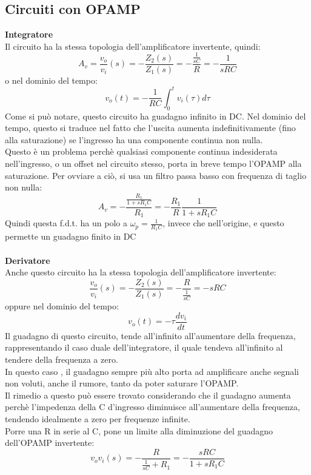 \documentclass{article}
\begin{document}
\subsection{Circuiti con OPAMP}
\textbf{Integratore}\\
Il circuito ha la stessa topologia dell'amplificatore invertente, quindi:
\begin{equation}
    A_{v}=\frac{v_{o}}{v_{i}}(s)=-\frac{Z_{2}(s)}{Z_{1}(s)}=-\frac{\frac{1}{sC}}{R}=-\frac{1}{sRC}
\end{equation}
o nel dominio del tempo:
\begin{equation}
    v_{o}(t)=-\frac{1}{RC}\int_{0}^{t}v_{i}(\tau)d\tau
\end{equation}
Come si può notare, questo circuito ha guadagno infinito in DC. Nel dominio del tempo, questo si traduce nel fatto che l'uscita aumenta indefinitivamente (fino alla saturazione) se l'ingresso ha una componente continua non nulla.\\
Questo è un problema perchè qualsiasi componente continua indesiderata nell'ingresso, o un offset nel circuito stesso, porta in breve tempo l'OPAMP alla saturazione.
Per ovviare a ciò, si usa un filtro passa basso con frequenza di taglio non nulla:
\begin{equation}
A_{v}=-\frac{\frac{R_{1}}{1+sR_{1}C}}{R_{1}}=-\frac{R_{1}}{R}\frac{1}{1+sR_{1}C}
\end{equation}
Quindi questa f.d.t. ha un polo a $\omega_{p}=\frac{1}{R_{1}C}$, invece che nell'origine, e questo permette un guadagno finito in DC \\\\
\textbf{Derivatore}\\
Anche questo circuito ha la stessa topologia dell'amplificatore invertente:
\begin{equation}
    \frac{v_{o}}{v_{i}}(s)=-\frac{Z_{2}(s)}{Z_{1}(s)}=-\frac{R}{\frac{1}{sC}}=-sRC
\end{equation}
oppure nel dominio del tempo:
\begin{equation}
    v_{o}(t)=-\tau\frac{dv_{i}}{dt}
\end{equation}
Il guadagno di questo circuito, tende all'infinito all'aumentare della frequenza, rappresentando il caso duale dell'integratore, il quale tendeva all'infinito al tendere della frequenza a zero.\\
In questo caso , il guadagno sempre più alto porta ad amplificare anche segnali non voluti, anche il rumore, tanto da poter saturare l'OPAMP.\\
Il rimedio a questo può essere trovato considerando che il guadagno aumenta perchè l'impedenza della C d'ingresso diminuisce all'aumentare della frequenza, tendendo idealmente a zero per frequenze infinite.\\
Porre una R in serie al C, pone un limite alla diminuzione del guadagno dell'OPAMP invertente:
\begin{equation}
    {v_{o}}{v_{i}}(s)=-\frac{R}{\frac{1}{sC}+R_{1}}=-\frac{sRC}{1+sR_{1}C}
\end{equation}
\newpage
\end{document}
